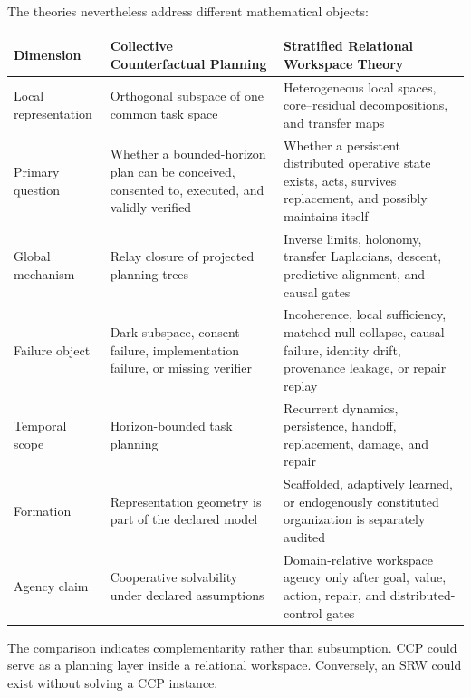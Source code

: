 
The theories nevertheless address different mathematical objects:
\begin{center}
\small
\begin{tabularx}{\textwidth}{@{}>{\raggedright\arraybackslash}p{}>{\raggedright\arraybackslash}X>{\raggedright\arraybackslash}X@{}}
\toprule
Dimension & Collective Counterfactual Planning & Stratified Relational Workspace Theory \\
\midrule
Local representation & Orthogonal subspace of one common task space & Heterogeneous local spaces, core--residual decompositions, and transfer maps \\
Primary question & Whether a bounded-horizon plan can be conceived, consented to, executed, and validly verified & Whether a persistent distributed operative state exists, acts, survives replacement, and possibly maintains itself \\
Global mechanism & Relay closure of projected planning trees & Inverse limits, holonomy, transfer Laplacians, descent, predictive alignment, and causal gates \\
Failure object & Dark subspace, consent failure, implementation failure, or missing verifier & Incoherence, local sufficiency, matched-null collapse, causal failure, identity drift, provenance leakage, or repair replay \\
Temporal scope & Horizon-bounded task planning & Recurrent dynamics, persistence, handoff, replacement, damage, and repair \\
Formation & Representation geometry is part of the declared model & Scaffolded, adaptively learned, or endogenously constituted organization is separately audited \\
Agency claim & Cooperative solvability under declared assumptions & Domain-relative workspace agency only after goal, value, action, repair, and distributed-control gates \\
\bottomrule
\end{tabularx}
\end{center}
The comparison indicates complementarity rather than subsumption. CCP could
serve as a planning layer inside a relational workspace. Conversely, an SRW
could exist without solving a CCP instance.


